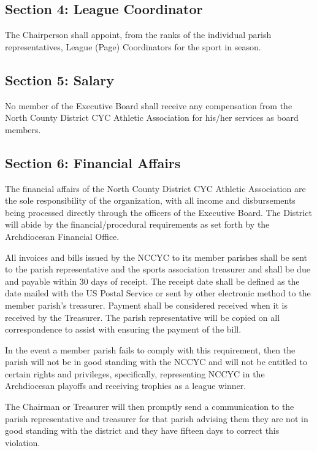\subsection{Section 4: League Coordinator}
\label{ssec:const-4-4}
The Chairperson shall appoint, from the ranks of the individual parish representatives, League (Page) Coordinators for the sport in season.

\subsection{Section 5: Salary}
\label{ssec:const-4-5}
No member of the Executive Board shall receive any compensation from the North County District CYC Athletic Association for his/her services as board members.

\subsection{Section 6: Financial Affairs}
\label{ssec:const-4-6}
The financial affairs of the North County District CYC Athletic Association are the sole responsibility of the organization, with all income and disbursements being processed directly through the officers of the Executive Board.  The District will abide by the financial/procedural requirements as set forth by the Archdiocesan Financial Office.

All invoices and bills issued by the NCCYC to its member parishes shall be sent to the parish representative and the sports association treasurer and shall be due and payable within 30 days of receipt.  The receipt date shall be defined as the date mailed with the US Postal Service or sent by other electronic method to the member parish’s treasurer.  Payment shall be considered received when it is received by the Treasurer.  The parish representative will be copied on all correspondence to assist with ensuring the payment of the bill.

In the event a member parish fails to comply with this requirement, then the parish will not be in good standing with the NCCYC and will not be entitled to certain rights and privileges, specifically, representing NCCYC in the Archdiocesan playoffs and receiving trophies as a league winner.

The Chairman or Treasurer will then promptly send a communication to the parish representative and treasurer for that parish advising them they are not in good standing with the district and they have fifteen days to correct this violation.

